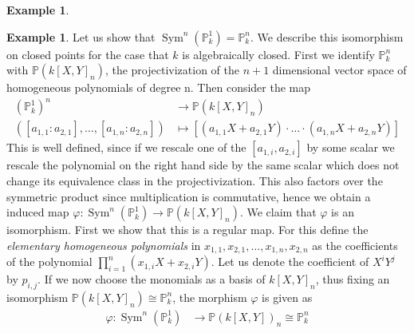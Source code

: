 \documentclass[11pt, a4paper, english, twoside]{article}
\theoremstyle{plain}
\theoremstyle{definition}
\newtheorem{example}[theorem]{Example}
\DeclareMathOperator{\Sym}{Sym}
\begin{document}
\begin{example}
\end{example}

\begin{example}
    Let us show that $\Sym^n(\mathbb{P}_k^1) = \mathbb{P}_k^n$. 
    We describe this isomorphism on closed points for the case that $k$ is algebraically closed.
    First we identify $\mathbb{P}_k^n$ with $\mathbb{P}(k[X,Y]_n)$, the projectivization of the $n+1$ dimensional vector space of
    homogeneous polynomials of degree n. Then consider the map
    \begin{align*}
        (\mathbb{P}_k^1)^n &\to \mathbb{P}(k[X,Y]_n)\\
        ([a_{1,1}:a_{2,1}],\dots,[a_{1,n}:a_{2,n}]) &\mapsto [(a_{1,1}X + a_{2,1}Y)\cdot \ldots \cdot(a_{1,n}X + a_{2,n}Y)]
    \end{align*}
    This is well defined, since if we rescale one of the $[a_{1,i},a_{2,i}]$ by some scalar we rescale the polynomial on the right hand side
    by the same scalar which does not change its equivalence class in the projectivization.
    This also factors over the symmetric product since multiplication is commutative, hence we obtain a induced map
    $\varphi \colon \Sym^n(\mathbb{P}_k^1) \to \mathbb{P}(k[X,Y]_n)$. 
    We claim that $\varphi$ is an isomorphism. First we show that this is a regular map.
    For this define the \emph{elementary homogeneous polynomials} in $x_{1,1},x_{2,1},\dots,x_{1,n},x_{2,n}$ as the coefficients of the polynomial
    $\prod_{i=1}^n (x_{1,i}X+ x_{2,i}Y)$. Let us denote the coefficient of $X^iY^j$ by $p_{i,j}$.
    If we now choose the monomials as a basis of $k[X,Y]_n$, thus fixing an isomorphism $\mathbb{P}(k[X,Y]_n) \cong \mathbb{P}_k^n$,
     the morphism $\varphi$ is given as
    \begin{align*}
        \varphi \colon \Sym^n(\mathbb{P}_k^1) &\to \mathbb{P}(k[X,Y])_n \cong \mathbb{P}_k^n\\

\end{align*}
\end{example}
\end{document}
